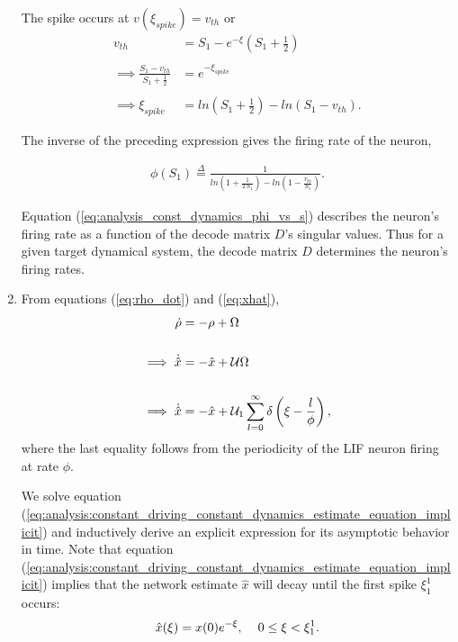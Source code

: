 \begin{enumerate}
The spike occurs at $v(\xi_{spike}) = v_{th}$ or 
\begin{align*}
v_{th} &= S_1 - e^
{
	-\xi
}
(
	S_1 + \frac		
		  {
			  1
		  }
		  {
			  2
		  }
 ) 
%
\\
\\
%
\implies 
\frac
{
	S_1 - v_{th}  
}
{
	S_1 + \frac
		  {
		       1
		  }
		  {
		  	   2
		  }
}
&=
e^
{
	-\xi_{spike}
}
%
\\
\\
%
\implies
\xi_{spike}
&= 
ln
(
	S_1 + \frac
			{
				1
			}
			{
				2
			}
)
- 
ln
(
	S_1 - v_{th}
).
\end{align*}

The inverse of the preceding expression gives the firing rate of the neuron,

\begin{align}
\label{eq:analysis_const_dynamics_phi_vs_s}
\phi(S_1)
\overset{\Delta}{=}
\frac
{
	1
} 
{
	ln
	(
		1 + \frac
				{
					1
				}
				{
					2 \, S_1
				}
	)
	- 
	ln
	(
		1 - \frac
			{
				v_{th}
			}
			{
				S_1
			}
	)
}.
\end{align}

Equation (\ref{eq:analysis_const_dynamics_phi_vs_s}) describes the neuron's firing rate as a function of the decode matrix $D$'s singular values. Thus for a given target dynamical system, the decode matrix $D$ determines the neuron's firing rates. 

\item From equations (\ref{eq:rho_dot}) and (\ref{eq:xhat}),
\begin{align}
\label{eq:analysis:constant_driving_constant_dynamics_estimate_equation_implicit}
\dot
{
	\rho
}
&= 	- \rho  + \Omega \notag
% 
\\ \notag
\\ \notag
%
\implies
\dot{
	\hat
	{
		x
	}
}
&= 
-\hat
{
	x
}
+ \mathcal{U} \Omega
\\ \notag
\\ 
%
\implies
\dot
{
	\hat
	{
		x
	}
}
&= 
-\hat
{
	x
}
+
\mathcal
{
	U
}_1 
\sum_
{
	l=0
}
^
{
	\infty
}
\delta 
\left(
	\xi - \frac
		  {
			  l
		  }
		  {
			  \phi
		  }
\right),
\end{align}
where the last equality follows from the periodicity of the LIF neuron firing at rate $\phi$.

We solve equation (\ref{eq:analysis:constant_driving_constant_dynamics_estimate_equation_implicit}) and inductively derive an explicit expression for its asymptotic behavior in time. Note that equation (\ref{eq:analysis:constant_driving_constant_dynamics_estimate_equation_implicit}) implies that the network estimate $\hat{x}$ will decay until the first spike $\xi_1^1$ occurs:
\begin{align*}
\hat{x}(\xi) = x(0) e^{-\xi}, \hspace{4mm} 0 \leq \xi < \xi_1^1.
\end{align*}



\end{enumerate}
